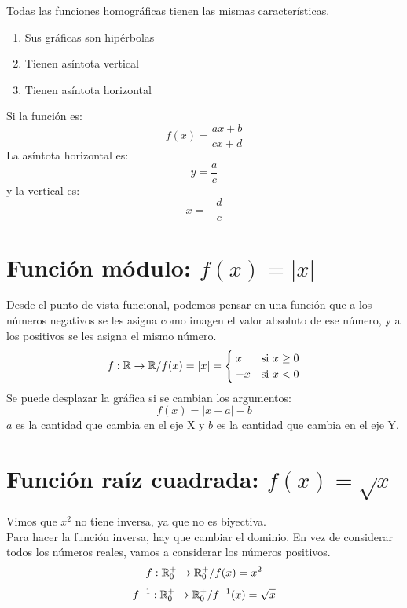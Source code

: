 Todas las funciones homográficas tienen las mismas características.
\begin{enumerate}
    \item Sus gráficas son hipérbolas
    \item Tienen asíntota vertical
    \item Tienen asíntota horizontal
\end{enumerate}
Si la función es:
$$f(x) = \frac{ax + b}{cx + d}$$
La asíntota horizontal es:
$$y = \frac{a}{c}$$
y la vertical es:
$$x = -\frac{d}{c}$$

\section{Función módulo: $f(x) = |x|$}
Desde el punto de vista funcional, podemos pensar en una función que a los números negativos se les asigna como imagen el valor absoluto de ese número, y a los positivos se les asigna el mismo número.
$$f : {\mathbb{R}} \rightarrow {\mathbb{R}} / f(x) = |x| = 
\begin{cases}
    x & \text{si } x \geq 0 \\
    -x & \text{si } x < 0
\end{cases}
$$
Se puede desplazar la gráfica si se cambian los argumentos: 
$$f(x) = |x - a| - b$$
$a$ es la cantidad que cambia en el eje X y $b$ es la cantidad que cambia en el eje Y.

\section{Función raíz cuadrada: $f(x) = \sqrt{x}$}
Vimos que $x^2$ no tiene inversa, ya que no es biyectiva.\\
Para hacer la función inversa, hay que cambiar el dominio. En vez de considerar todos los números reales, vamos a considerar los números positivos.
$$f: {\mathbb{R}}_0^+ \rightarrow {\mathbb{R}}_0^+ / f(x) = x^2 $$
$$ f^{-1} : {\mathbb{R}}_0^+ \rightarrow {\mathbb{R}}_0^+ / f^{-1}(x) = \sqrt{x}$$


